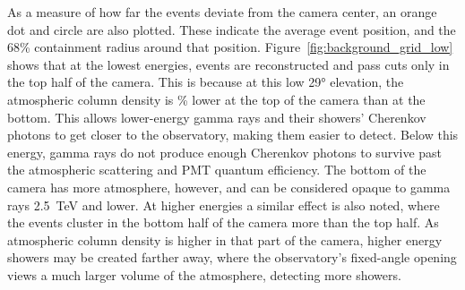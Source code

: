 As a measure of how far the events deviate from the camera center, an orange dot and circle are also plotted.
These indicate the average event position, and the 68\% containment radius around that position.
Figure~\ref{fig:background_grid_low} shows that at the lowest energies, events are reconstructed and pass cuts only in the top half of the camera.
This is because at this low \ang{29} elevation, the atmospheric column density is \% lower at the top of the camera than at the bottom.
This allows lower-energy gamma rays and their showers' Cherenkov photons to get closer to the observatory, making them easier to detect.
Below this energy, gamma rays do not produce enough Cherenkov photons to survive past the atmospheric scattering and PMT quantum efficiency.
The bottom of the camera has more atmosphere, however, and can be considered opaque to gamma rays \SI{2.5}{TeV} and lower.
At higher energies a similar effect is also noted, where the events cluster in the bottom half of the camera more than the top half.
As atmospheric column density is higher in that part of the camera, higher energy showers may be created farther away, where the observatory's fixed-angle opening views a much larger volume of the atmosphere, detecting more showers.

